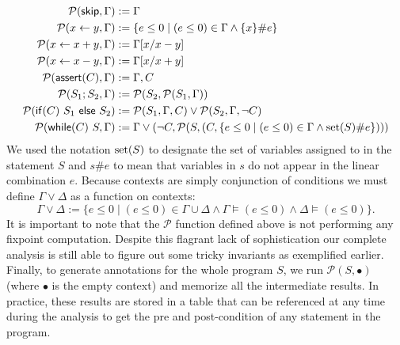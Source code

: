 \documentclass[10pt]{article}
\begin{document}
\begin{align*}
\mathcal P(\mathsf{skip}, \Gamma) &:= \Gamma \\
\mathcal P(x \gets y, \Gamma) &:= \{ e \le 0 \mid (e \le 0) \in \Gamma \land \{x\} \# e \} \\
\mathcal P(x \gets x + y, \Gamma) &:= \Gamma[x / x - y] \\
\mathcal P(x \gets x - y, \Gamma) &:= \Gamma[x / x + y] \\
\mathcal P(\mathsf{assert}(C), \Gamma) &:= \Gamma,C \\
\mathcal P(S_1; S_2, \Gamma) &:= \mathcal P(S_2, \mathcal P(S_1, \Gamma)) \\
\mathcal P(\mathsf{if} (C)~S_1~\mathsf{else}~S_2) &:=
  \mathcal P(S_1, \Gamma,C) \lor \mathcal P(S_2, \Gamma,\neg C) \\
\mathcal P(\mathsf{while}(C)~S, \Gamma) &:=
  \Gamma \lor (\neg C, \mathcal P(S, (C, \{ e \le 0 \mid (e \le 0) \in \Gamma \land {\rm set}(S) \# e \})))
\end{align*}
We used the notation ${\rm set}(S)$ to designate the set of variables
assigned to in the statement $S$ and $s\#e$ to mean that variables
in $s$ do not appear in the linear combination $e$.  Because contexts
are simply conjunction of conditions we must define $\Gamma \lor \Delta$
as a function on contexts:
$$
\Gamma \lor \Delta := \{ e \le 0 \mid (e \le 0) \in \Gamma \cup \Delta \land \Gamma \models (e \le 0) \land \Delta \models (e \le 0) \}.
$$
It is important to note that the $\mathcal P$ function defined above
is not performing any fixpoint computation.  Despite this flagrant
lack of sophistication our complete analysis is still able to figure out some
tricky invariants as exemplified earlier.
Finally, to generate annotations for the whole program $S$,
we run $\mathcal P(S,\bullet)$ (where $\bullet$ is the empty context)
and memorize all the intermediate results.  In practice, these results are stored in
a table that can be referenced at any time during the analysis to get the
pre and post-condition of any statement in the program.
\end{document}
